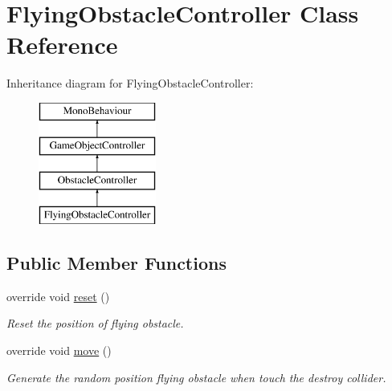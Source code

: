 \hypertarget{class_flying_obstacle_controller}{}\section{Flying\+Obstacle\+Controller Class Reference}
\label{class_flying_obstacle_controller}
Inheritance diagram for Flying\+Obstacle\+Controller\+:\begin{figure}[H]
\begin{center}
\leavevmode
\includegraphics[height=4.000000cm]{class_flying_obstacle_controller}
\end{center}
\end{figure}
\subsection*{Public Member Functions}
\begin{DoxyCompactItemize}
\item 
override void \hyperlink{class_flying_obstacle_controller_ab2b5e0c2f00348c159ded251e1ca61c0}{reset} ()
\begin{DoxyCompactList}\small\item\em Reset the position of flying obstacle. \end{DoxyCompactList}\item 
override void \hyperlink{class_flying_obstacle_controller_afd00f43efeabf1068a6ddb7ece716700}{move} ()
\begin{DoxyCompactList}\small\item\em Generate the random position flying obstacle when touch the destroy collider. \end{DoxyCompactList}\end{DoxyCompactItemize}
